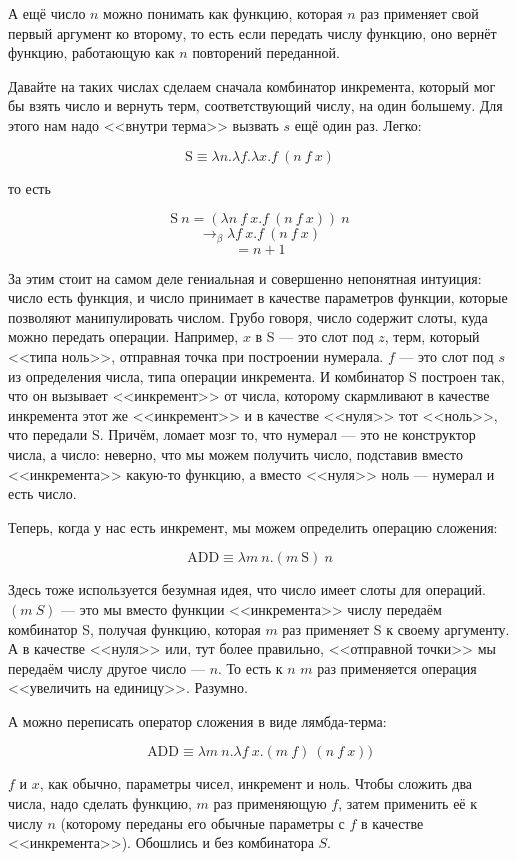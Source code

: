 \documentclass[a5paper]{article}
\begin{document}
А ещё число $n$ можно понимать как функцию, которая $n$ раз применяет свой первый аргумент ко второму, то есть если передать числу функцию, оно вернёт функцию, работающую как $n$ повторений переданной.

Давайте на таких числах сделаем сначала комбинатор инкремента, который мог бы взять число и вернуть терм, соответствующий числу, на один большему. Для этого нам надо <<внутри терма>> вызвать $s$ ещё один раз. Легко:

$$\mbox{S}\equiv \lambda n.\lambda f.\lambda x.f\ (n\ f\ x)$$

то есть

$$\mbox{S}\ n = (\lambda n\ f\ x.f\ (n\ f\ x))\ n$$
$$\rightarrow_\beta \lambda f\ x.f\ (n\ f\ x)$$
$$= n + 1$$

За этим стоит на самом деле гениальная и совершенно непонятная интуиция: число есть функция, и число принимает в качестве параметров функции, которые позволяют манипулировать числом. Грубо говоря, число содержит слоты, куда можно передать операции. Например, $x$ в S --- это слот под $z$, терм, который <<типа ноль>>, отправная точка при построении нумерала. $f$ --- это слот под $s$ из определения числа, типа операции инкремента. И комбинатор S построен так, что он вызывает <<инкремент>> от числа, которому скармливают в качестве инкремента этот же <<инкремент>> и в качестве <<нуля>> тот <<ноль>>, что передали S. Причём, ломает мозг то, что нумерал --- это не конструктор числа, а число: неверно, что мы можем получить число, подставив вместо <<инкремента>> какую-то функцию, а вместо <<нуля>> ноль --- нумерал и есть число.

Теперь, когда у нас есть инкремент, мы можем определить операцию сложения:

$$\mbox{ADD} \equiv \lambda m\ n.(m\ \mbox{S})\ n$$

Здесь тоже используется безумная идея, что число имеет слоты для операций. $(m\ S)$ --- это мы вместо функции <<инкремента>> числу передаём комбинатор S, получая функцию, которая $m$ раз применяет S к своему аргументу. А в качестве <<нуля>> или, тут более правильно, <<отправной точки>> мы передаём числу другое число --- $n$. То есть к $n$ $m$ раз применяется операция <<увеличить на единицу>>. Разумно.

А можно переписать оператор сложения в виде лямбда-терма:

$$\mbox{ADD} \equiv \lambda m\ n.\lambda f\ x.(m\ f)\ (n\ f\ x))$$

$f$ и $x$, как обычно, параметры чисел, инкремент и ноль. Чтобы сложить два числа, надо сделать функцию, $m$ раз применяющую $f$, затем применить её к числу $n$ (которому переданы его обычные параметры с $f$ в качестве <<инкремента>>). Обошлись и без комбинатора $S$.
\end{document}
